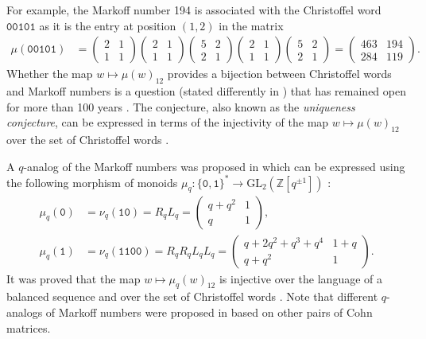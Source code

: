 \documentclass[a4paper,12pt]{amsart}
\newcommand{\Z}{\mathbb{Z}}
\newcommand{\GL}{\mathrm{GL}}
\newcommand{\0}{\mathtt{0}}
\newcommand{\1}{\mathtt{1}}
\newcommand{\2}{\mathtt{2}}
\newcommand{\3}{\mathtt{3}}
\begin{document}
For example, the Markoff number 194 is associated with the Christoffel word $\0\0\1\0\1$
as it is the entry at position $(1,2)$ in the matrix
\begin{align*}
\mu(\0\0\1\0\1)
&=
\begin{pmatrix} 2 & 1 \\ 1 & 1 \end{pmatrix}
\begin{pmatrix} 2 & 1 \\ 1 & 1 \end{pmatrix}
\begin{pmatrix} 5 & 2 \\ 2 & 1 \end{pmatrix}
\begin{pmatrix} 2 & 1 \\ 1 & 1 \end{pmatrix}
\begin{pmatrix} 5 & 2 \\ 2 & 1 \end{pmatrix}
=
\begin{pmatrix} 463 & 194 \\ 284 & 119 \end{pmatrix}.
\end{align*}
Whether the map $w\mapsto\mu(w)_{12}$ provides a bijection between Christoffel
words and Markoff numbers is a question (stated differently in \cite{F1913})
that has remained open for more than 100 years \cite{MR3098784}.
The conjecture, also known as the \emph{uniqueness conjecture}, can be
expressed in terms of the injectivity of the map $w\mapsto\mu(w)_{12}$
over the set of Christoffel words \cite[\S 3.3]{MR3887697}.

%
%
%

A $q$-analog of the Markoff numbers was proposed in \cite{kogiso_q-deformations_2020}
which can be expressed using the following morphism of monoids
$\mu_q:\{\0,\1\}^*\to\GL_2(\Z[q^{\pm 1}])$ \cite{MR4265544}:
\begin{align*}
    \mu_q(\0)
    &=\nu_q(\1\0)
    =R_qL_q
    =
\begin{pmatrix}
    q + q^{2} & 1 \\
    q & 1
\end{pmatrix},\\
    \mu_q(\1)
    &=\nu_q(\1\1\0\0)
    =R_qR_qL_qL_q
    =
\begin{pmatrix}
    q + 2q^2+q^3+q^4 & 1 + q \\
    q + q^{2} & 1
\end{pmatrix}.
\end{align*}
It was proved that
the map $w\mapsto\mu_q(w)_{12}$ is injective
over the language of a balanced sequence \cite{MR4405998}
and over the set of Christoffel words \cite{MR4686132}.
Note that different $q$-analogs of Markoff numbers were proposed in
\cite{evans_q-deformed_2025} based on other pairs of Cohn matrices.
\end{document}
